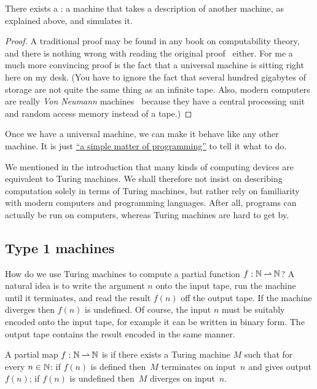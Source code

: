 \begin{theorem}[Turing]
  \label{thm:universal-machine}
  There exists a : a machine that takes a
  description of another machine, as explained above, and simulates
  it.
\end{theorem}

\begin{proof}
  A traditional proof may be found in any book on computability
  theory, and there is nothing wrong with reading the original
  proof~ either.
  For me a much more convincing proof is the fact that a universal
  machine is sitting right here on my desk. (You have to
    ignore the fact that several hundred gigabytes of storage are not
    quite the same thing as an infinite tape. Also, modern computers
    are really \emph{Von Neumann}
    machines~ because
    they have a central processing unit and random access memory
    instead of a tape.)
\end{proof}

Once we have a universal machine, we can make it behave like any other
machine. It is just
\href{http://www.catb.org/jargon/html/S/SMOP.html}{``a simple matter
  of programming''} to tell it what to do.

We mentioned in the introduction that many kinds of computing devices
are equivalent to Turing machines. We shall therefore not insist on
describing computation solely in terms of Turing machines, but rather
rely on familiarity with modern computers and programming languages.
After all, programs can actually be run on computers, whereas Turing
machines are hard to get by.


\subsection{Type 1 machines}
\label{sec:type-1}

How do we use Turing machines to compute a partial function $f :
\mathbb{N} \mathbin{\rightharpoonup} \mathbb{N}$? A natural idea is to write the argument $n$ onto the
input tape, run the machine until it terminates, and read the result
$f(n)$ off the output tape. If the machine diverges then $f(n)$ is
undefined. Of course, the input $n$ must be suitably encoded onto the
input tape, for example it can be written in binary form. The output
tape contains the result encoded in the same manner.

\begin{definition}
  A partial map $f : \mathbb{N} \mathbin{\rightharpoonup} \mathbb{N}$ is  if there exists a Turing machine $M$ such that for every $n \in \mathbb{N}$: if $f(n)$ is defined then~$M$ terminates on input~$n$ and gives output $f(n)$; if $f(n)$ is undefined then~$M$ diverges on input~$n$.
\end{definition}

